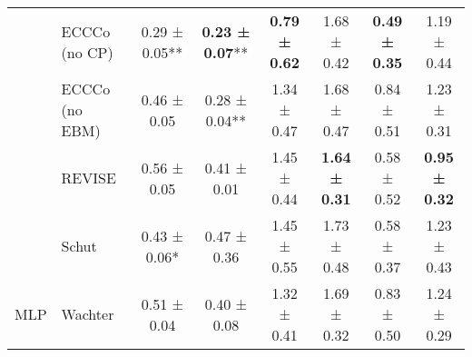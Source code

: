 \begin{table*}[t]
{\begin{tabular}[t]{llcccccc}
 & ECCCo (no CP) & 0.29 ± 0.05** & \textbf{0.23 ± 0.07}** & \textbf{0.79 ± 0.62}\hphantom{*}\hphantom{*} & 1.68 ± 0.42\hphantom{*}\hphantom{*} & \textbf{0.49 ± 0.35}\hphantom{*}\hphantom{*} & 1.19 ± 0.44\hphantom{*}\hphantom{*}\\

 & ECCCo (no EBM) & 0.46 ± 0.05\hphantom{*}\hphantom{*} & 0.28 ± 0.04** & 1.34 ± 0.47\hphantom{*}\hphantom{*} & 1.68 ± 0.47\hphantom{*}\hphantom{*} & 0.84 ± 0.51\hphantom{*}\hphantom{*} & 1.23 ± 0.31\hphantom{*}\hphantom{*}\\

 & REVISE & 0.56 ± 0.05\hphantom{*}\hphantom{*} & 0.41 ± 0.01\hphantom{*}\hphantom{*} & 1.45 ± 0.44\hphantom{*}\hphantom{*} & \textbf{1.64 ± 0.31}\hphantom{*}\hphantom{*} & 0.58 ± 0.52\hphantom{*}\hphantom{*} & \textbf{0.95 ± 0.32}\hphantom{*}\hphantom{*}\\

 & Schut & 0.43 ± 0.06*\hphantom{*} & 0.47 ± 0.36\hphantom{*}\hphantom{*} & 1.45 ± 0.55\hphantom{*}\hphantom{*} & 1.73 ± 0.48\hphantom{*}\hphantom{*} & 0.58 ± 0.37\hphantom{*}\hphantom{*} & 1.23 ± 0.43\hphantom{*}\hphantom{*}\\

\multirow{-6}{*}{\raggedright\arraybackslash MLP} & Wachter & 0.51 ± 0.04\hphantom{*}\hphantom{*} & 0.40 ± 0.08\hphantom{*}\hphantom{*} & 1.32 ± 0.41\hphantom{*}\hphantom{*} & 1.69 ± 0.32\hphantom{*}\hphantom{*} & 0.83 ± 0.50\hphantom{*}\hphantom{*} & 1.24 ± 0.29\hphantom{*}\hphantom{*}\\
\bottomrule
\end{tabular}}
\end{table*}
